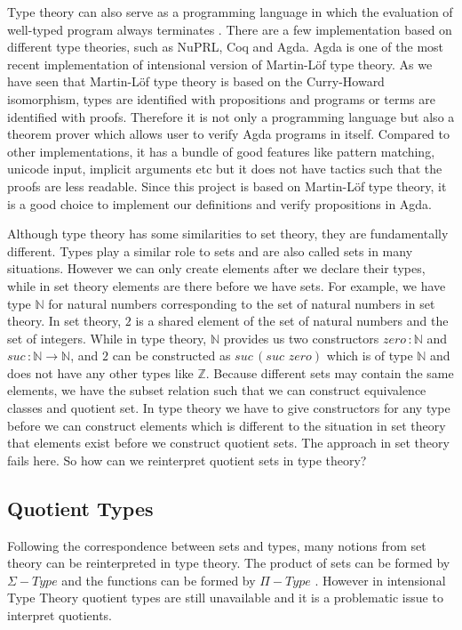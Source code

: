 \documentclass{article}
\theoremstyle{definition}
\newcommand{\N}{\mathbb{N}}
\newcommand{\Z}{\mathbb{Z}}
\newcommand{\itt}{intensional Type Theory}
\newcommand{\mltt}{Martin-L\"{o}f type theory}
\begin{document}
Type theory can also serve as a programming language in
which the evaluation of well-typed program always terminates
\cite{nor:90}. 
There are a few implementation based on different type theories, such as
NuPRL, Coq and Agda.
Agda is one of the most recent implementation of intensional version
of \mltt{}. As we have seen that \mltt{} is based on the Curry-Howard
isomorphism, types are identified with propositions and programs or
terms are identified with proofs. Therefore it is not only a programming language but also a
theorem prover which allows user to verify Agda programs in
itself. Compared to other implementations, it has a bundle of good
features like pattern matching, unicode input, implicit arguments etc
\cite{bov:09}  but it does not have tactics such that the proofs are less
readable. Since this project is based on \mltt{}, it is a good choice to implement our definitions
and verify propositions in Agda.

Although type theory has some similarities to set theory, they are
fundamentally different. Types play a similar role to sets and are
also called sets in many situations. However we can only create
elements after we declare their types, while in set theory elements are there before
we have sets. For example,
we have type $\N$ for natural numbers corresponding to the set of
natural numbers in set theory. In set theory, $2$ is a shared element
of the set of natural numbers and the set of integers. While in type
theory, $\N$ provides us two constructors
$zero \,\colon\N$ and $suc\,\colon\N\to\N$, and $2$ can be constructed
as $suc\,(suc\,\,zero)$ which is of type $\N$ and does not have any other
types like $\Z$. Because different sets may contain the same elements, we
have the subset relation such that we can construct equivalence
classes and quotient set. In type theory we have to give constructors
for any type before we can construct elements which is different to the situation in set theory that
elements exist before we construct quotient sets. The approach in set
theory fails here. So how can we reinterpret quotient sets in type theory? 


\subsection{Quotient Types}

Following the correspondence between sets and types, many notions from
set theory can be reinterpreted in type theory. The product of
sets can be formed by $\Sigma-Type$ and the functions can be
formed by $\Pi-Type$ \cite{nor:00}. However in \itt{} quotient
types are still unavailable and it is a problematic issue to interpret
quotients.
\end{document}
